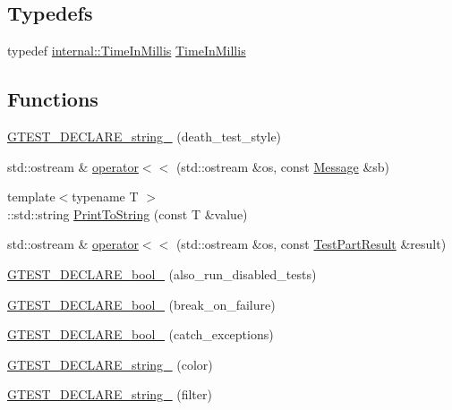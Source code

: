 \subsection*{Typedefs}
\begin{DoxyCompactItemize}
\item 
typedef \hyperlink{namespacetesting_1_1internal_a66a845df404b38fe85c5e14a069f255a}{internal\+::\+Time\+In\+Millis} \hyperlink{namespacetesting_a992de1d091ce660f451d1e8b3ce30fd6}{Time\+In\+Millis}
\end{DoxyCompactItemize}
\subsection*{Functions}
\begin{DoxyCompactItemize}
\item 
\hyperlink{namespacetesting_a37b7e87f0a5f502c6918f37d1768c1f3}{G\+T\+E\+S\+T\+\_\+\+D\+E\+C\+L\+A\+R\+E\+\_\+string\+\_\+} (death\+\_\+test\+\_\+style)
\item 
std\+::ostream \& \hyperlink{namespacetesting_a7b802e532fd68749765cb7dc156130db}{operator$<$$<$} (std\+::ostream \&os, const \hyperlink{classtesting_1_1_message}{Message} \&sb)
\item 
{\footnotesize template$<$typename T $>$ }\\\+::std\+::string \hyperlink{namespacetesting_aa5717bb1144edd1d262d310ba70c82ed}{Print\+To\+String} (const T \&value)
\item 
std\+::ostream \& \hyperlink{namespacetesting_a7c88897836b9f492190fb2b9dfa3a327}{operator$<$$<$} (std\+::ostream \&os, const \hyperlink{classtesting_1_1_test_part_result}{Test\+Part\+Result} \&result)
\item 
\hyperlink{namespacetesting_a4c08ba9fcb0581c61e25968e520efa48}{G\+T\+E\+S\+T\+\_\+\+D\+E\+C\+L\+A\+R\+E\+\_\+bool\+\_\+} (also\+\_\+run\+\_\+disabled\+\_\+tests)
\item 
\hyperlink{namespacetesting_a5868c3980b2f69f511fc8c3de7cdfc17}{G\+T\+E\+S\+T\+\_\+\+D\+E\+C\+L\+A\+R\+E\+\_\+bool\+\_\+} (break\+\_\+on\+\_\+failure)
\item 
\hyperlink{namespacetesting_ab6f1777f7b740f31e41f7da017447b58}{G\+T\+E\+S\+T\+\_\+\+D\+E\+C\+L\+A\+R\+E\+\_\+bool\+\_\+} (catch\+\_\+exceptions)
\item 
\hyperlink{namespacetesting_a0f658c915a1e60996a2ab00a06612723}{G\+T\+E\+S\+T\+\_\+\+D\+E\+C\+L\+A\+R\+E\+\_\+string\+\_\+} (color)
\item 
\hyperlink{namespacetesting_a20d69860ce843142c7f740262e6b0c9a}{G\+T\+E\+S\+T\+\_\+\+D\+E\+C\+L\+A\+R\+E\+\_\+string\+\_\+} (filter)

\end{DoxyCompactItemize}
